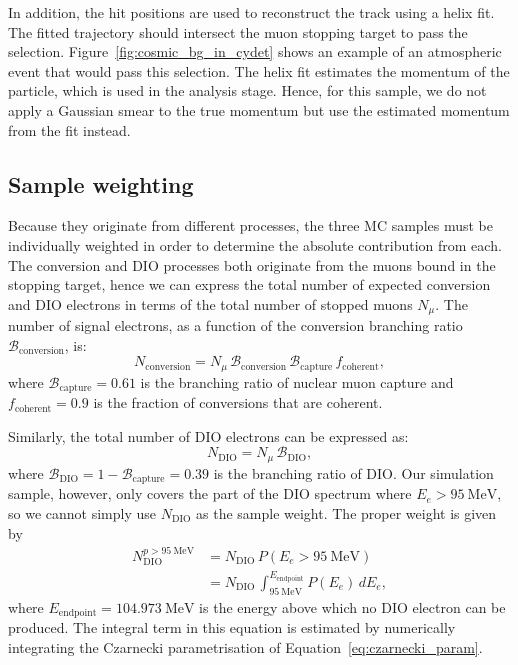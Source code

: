 In addition, the hit positions are used to reconstruct the track using a helix
fit. The fitted trajectory should intersect the muon stopping target to pass the
selection. Figure~\ref{fig:cosmic_bg_in_cydet} shows an example of an
atmospheric event that would pass this selection. The helix fit estimates the
momentum of the particle, which is used in the analysis stage. Hence, for this
sample, we do not apply a Gaussian smear to the true momentum but use the
estimated momentum from the fit instead.


\subsection{Sample weighting}

Because they originate from different processes, the three MC samples must be
individually weighted in order to determine the absolute contribution from each.
The conversion and DIO processes both originate from the muons bound in the
stopping target, hence we can express the total number of expected conversion
and DIO electrons in terms of the total number of stopped muons $N_\mu$.
The number of signal electrons, as a function of the conversion branching
ratio $\mathcal{B}_\mathrm{conversion}$, is:
\begin{equation}\label{eq:weight_signal}
N_\mathrm{conversion} = 
N_\mu \, \mathcal{B}_\mathrm{conversion} \, 
\mathcal{B}_\mathrm{capture} \, f_\mathrm{coherent},
\end{equation}
where $\mathcal{B}_\mathrm{capture} = 0.61$ is the branching ratio of nuclear
muon capture and $f_\mathrm{coherent}=0.9$ is the
fraction of conversions that are coherent.

Similarly, the total number of DIO electrons can be expressed as:
$$
N_\mathrm{DIO} = N_\mu \, \mathcal{B}_\mathrm{DIO},
$$
where $\mathcal{B}_\mathrm{DIO} = 1 - \mathcal{B}_\mathrm{capture} = 0.39$ is
the branching ratio of DIO. Our simulation sample, however, only covers the part
of the DIO spectrum where $E_e > \SI{95}{\MeV}$, so we cannot simply use
$N_\mathrm{DIO}$ as the sample weight. The proper weight is given by 
\begin{align}\label{eq:weight_dio}
N_\mathrm{DIO}^{p>\SI{95}{\MeV}} &= N_\mathrm{DIO} \, P(E_e > \SI{95}{\MeV}) \\\nonumber
&= N_\mathrm{DIO}\,\int_{\SI{95}{\MeV}}^{E_\mathrm{endpoint}} P(E_e)\,dE_e,
\end{align}
where $E_\mathrm{endpoint} = \SI{104.973}{\MeV}$ is the energy above which no
DIO electron can be produced. The integral term in this equation is estimated by
numerically integrating the Czarnecki parametrisation of
Equation~\ref{eq:czarnecki_param}.

